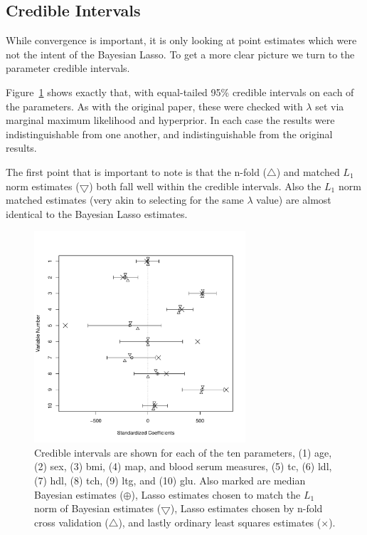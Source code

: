 \documentclass{uwstat572}
\begin{document}
\subsection{Credible Intervals}
While convergence is important, it is only looking at point estimates which were not the intent of the Bayesian Lasso. To get a more clear picture we turn to the parameter credible intervals. 

Figure~\ref{CIs} shows exactly that, with equal-tailed 95\% credible intervals on each of the parameters. As with the original paper, these were checked with $\lambda$ set via marginal maximum likelihood and hyperprior. In each case the results were indistinguishable from one another, and indistinguishable from the original results.

The first point that is important to note is that the n-fold ($\bigtriangleup$) and matched $L_1$ norm estimates ($\bigtriangledown$) both fall well within the credible intervals. Also the $L_1$ norm matched estimates (very akin to selecting for the same $\lambda$ value) are almost identical to the Bayesian Lasso estimates. 

\begin{figure}\label{CIs}
  \centering
    \includegraphics[width=0.7\textwidth]{SaveFigure2.pdf}
  \caption{Credible intervals are shown for each of the ten parameters, (1) age, (2) sex, (3) bmi, (4) map, and blood serum measures, (5) tc, (6) ldl, (7) hdl, (8) tch, (9) ltg, and (10) glu. Also marked are median Bayesian estimates ($\oplus$), Lasso estimates chosen to match the $L_1$ norm of Bayesian estimates ($\bigtriangledown$), Lasso estimates chosen by n-fold cross validation ($\bigtriangleup$), and lastly ordinary least squares estimates ($\times$).}
\end{figure}
\end{document}
